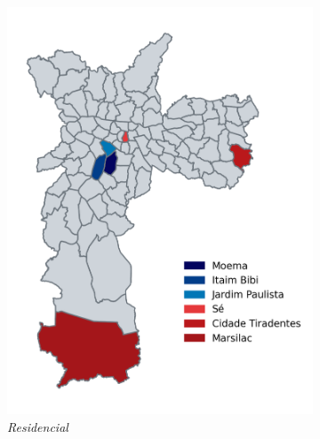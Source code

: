 \documentclass[12pt,a4paper]{article}
\theoremstyle{break}
\begin{document}
\begin{figure}[htbp]
\begin{subfigure}[b]{0.32\textwidth}
    \includegraphics[width=\textwidth]{q2_b.png}
    \caption*{\emph{Residencial}}
  \end{subfigure}
  \hfill %
  \begin{subfigure}[b]{0.32\textwidth}

\end{subfigure}
\end{figure}
\end{document}
